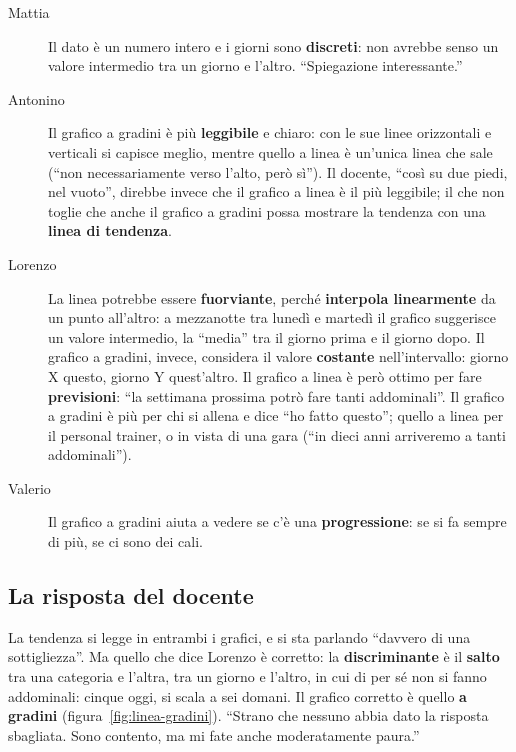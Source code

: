 \begin{description}
  \item[Mattia] Il dato è un numero intero e i giorni sono \textbf{discreti}:
        non avrebbe senso un valore intermedio tra un giorno e l'altro.
        ``Spiegazione interessante.''
  \item[Antonino] Il grafico a gradini è più \textbf{leggibile} e chiaro: con
        le sue linee orizzontali e verticali si capisce meglio, mentre quello
        a linea è un'unica linea che sale (``non necessariamente verso
        l'alto, però sì''). Il docente, ``così su due piedi, nel vuoto'',
        direbbe invece che il grafico a linea è il più leggibile; il che non
        toglie che anche il grafico a gradini possa mostrare la tendenza con
        una \textbf{linea di tendenza}.
  \item[Lorenzo] La linea potrebbe essere \textbf{fuorviante}, perché
        \textbf{interpola linearmente} da un punto all'altro: a mezzanotte
        tra lunedì e martedì il grafico suggerisce un valore intermedio, la
        ``media'' tra il giorno prima e il giorno dopo. Il grafico a gradini,
        invece, considera il valore \textbf{costante} nell'intervallo: giorno
        X questo, giorno Y quest'altro. Il grafico a linea è però ottimo per
        fare \textbf{previsioni}: ``la settimana prossima potrò fare tanti
        addominali''. Il grafico a gradini è più per chi si allena e dice
        ``ho fatto questo''; quello a linea per il personal trainer, o in
        vista di una gara (``in dieci anni arriveremo a tanti addominali'').
  \item[Valerio] Il grafico a gradini aiuta a vedere se c'è una
        \textbf{progressione}: se si fa sempre di più, se ci sono dei cali.
\end{description}

\subsection{La risposta del docente}

La tendenza si legge in entrambi i grafici, e si sta parlando ``davvero di
una sottigliezza''. Ma quello che dice Lorenzo è corretto: la
\textbf{discriminante} è il \textbf{salto} tra una categoria e l'altra, tra
un giorno e l'altro, in cui di per sé non si fanno addominali: cinque oggi,
si scala a sei domani. Il grafico corretto è quello \textbf{a gradini}
(figura~\ref{fig:linea-gradini}). ``Strano che nessuno abbia dato la risposta
sbagliata. Sono contento, ma mi fate anche moderatamente paura.''


